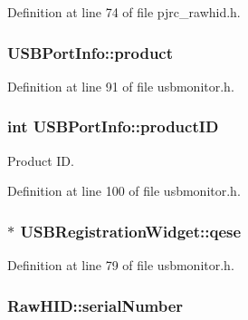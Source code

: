 \-Definition at line 74 of file pjrc\-\_\-rawhid.\-h.

\hypertarget{group___raw_h_i_d_plugin_ga8b2fb49e267664c4838e1205f57538d8}{
\subsubsection[{product}]{ {\bf \-U\-S\-B\-Port\-Info\-::product}}}\label{group___raw_h_i_d_plugin_ga8b2fb49e267664c4838e1205f57538d8}


\-Definition at line 91 of file usbmonitor.\-h.

\hypertarget{group___raw_h_i_d_plugin_ga5bcd5b32d008f2c5cd5a6d3b7ec23b97}{
\subsubsection[{product\-I\-D}]{\setlength{\rightskip}{0pt plus 5cm}int {\bf \-U\-S\-B\-Port\-Info\-::product\-I\-D}}}\label{group___raw_h_i_d_plugin_ga5bcd5b32d008f2c5cd5a6d3b7ec23b97}


\-Product \-I\-D. 



\-Definition at line 100 of file usbmonitor.\-h.

\hypertarget{group___raw_h_i_d_plugin_ga0cc367841d16c562f474b130448cc184}{
\subsubsection[{qese}]{$\ast$ {\bf \-U\-S\-B\-Registration\-Widget\-::qese}}}\label{group___raw_h_i_d_plugin_ga0cc367841d16c562f474b130448cc184}


\-Definition at line 79 of file usbmonitor.\-h.

\hypertarget{group___raw_h_i_d_plugin_ga0b5d9bd4ac69612199afa5b59dfc3ed6}{
\subsubsection[{serial\-Number}]{ {\bf \-Raw\-H\-I\-D\-::serial\-Number}}}\label{group___raw_h_i_d_plugin_ga0b5d9bd4ac69612199afa5b59dfc3ed6}



